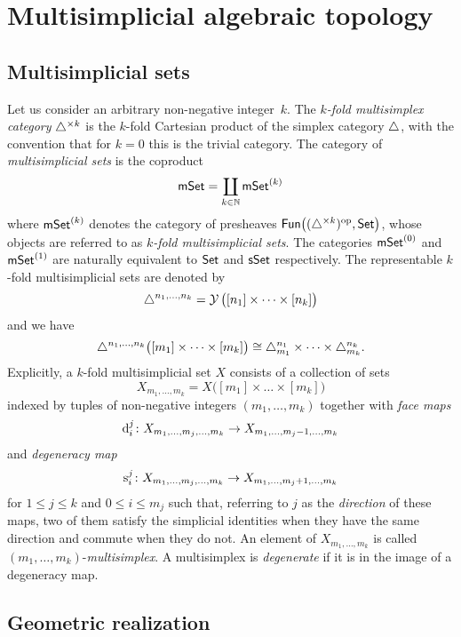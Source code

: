 
\section{Multisimplicial algebraic topology}

\subsection{Multisimplicial sets}

Let us consider an arbitrary non-negative integer~$k$.
The \textit{$k$-fold multisimplex category} $\triangle^{\times k}$ is the $k$-fold Cartesian product of the simplex category $\triangle$, with the convention that for $k = 0$ this is the trivial category.
The category of \textit{multisimplicial sets} is the coproduct
\[
\mathsf{mSet} = \coprod_{k \in \mathbb{N}} \mathsf{mSet}^{(k)}
\]
where $\mathsf{mSet}^{(k)}$ denotes the category of presheaves $\mathsf{Fun} \big( (\triangle^{\times k})^{\mathrm{op}}, \mathsf{Set} \big)$, whose objects are referred to as \textit{$k$-fold multisimplicial sets}.
The categories $\mathsf{mSet}^{(0)}$ and $\mathsf{mSet}^{(1)}$ are naturally equivalent to $\mathsf{Set}$ and $\mathsf{sSet}$ respectively.
The representable $k$-fold multisimplicial sets are denoted by
\[
\triangle^{n_1,\dots,n_k} =
\operatorname{\mathcal{Y}} \big([n_1]\times\dots\times[n_k]\big)
\]
and we have
\[
\triangle^{n_1,\dots,n_k} \big([m_1]\times\dots\times[m_k]\big) \cong
\triangle^{n_1}_{m_1}\times\dots\times\triangle^{n_k}_{m_k}.
\]
Explicitly, a $k$-fold multisimplicial set $X$ consists of a collection of sets
\[
X_{m_1,\dots,m_k} =
X \big( [m_1] \times\dots\times [m_k] \big)
\]
indexed by tuples of non-negative integers $(m_1,\dots,m_k)$ together with \textit{face maps}
\[
\operatorname{d}_i^j \colon
X_{m_1, \dots, m_j,\dots,m_k} \to
X_{m_1, \dots, m_j-1, \dots, m_k}
\]
and \textit{degeneracy map}
\[
\operatorname{s}^j_i \colon X_{m_1, \dots, m_j,\dots,m_k} \to X_{m_1, \dots, m_j+1, \dots, m_k}
\]
for $1 \leq j \leq k$ and $0 \leq i \leq m_j$ such that, referring to $j$ as the \textit{direction} of these maps, two of them satisfy the simplicial identities when they have the same direction and commute when they do not.
An element of $X_{m_1,\dots,m_k}$ is called
$(m_1,\dots,m_k)$-\textit{multisimplex}.
A multisimplex is \textit{degenerate} if it is in the image of a degeneracy map.

\subsection{Geometric realization}

